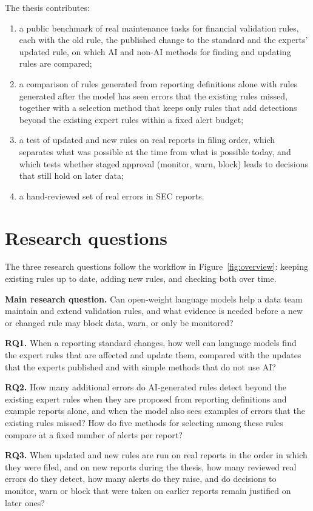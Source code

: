 \documentclass[11pt,a4paper]{article}
\let\oldsection\section
\renewcommand{\section}{\FloatBarrier\oldsection}
\begin{document}
The thesis contributes:
\begin{enumerate}
\item a public benchmark of real maintenance tasks for financial validation rules, each with the old rule, the published change to the standard and the experts' updated rule, on which AI and non-AI methods for finding and updating rules are compared;
\item a comparison of rules generated from reporting definitions alone with rules generated after the model has seen errors that the existing rules missed, together with a selection method that keeps only rules that add detections beyond the existing expert rules within a fixed alert budget;
\item a test of updated and new rules on real reports in filing order, which separates what was possible at the time from what is possible today, and which tests whether staged approval (monitor, warn, block) leads to decisions that still hold on later data;
\item a hand-reviewed set of real errors in SEC reports.
\end{enumerate}

\section{Research questions}
\label{sec:rq}

The three research questions follow the workflow in Figure~\ref{fig:overview}: keeping existing rules up to date, adding new rules, and checking both over time.

\textbf{Main research question.} Can open-weight language models help a data team maintain and extend validation rules, and what evidence is needed before a new or changed rule may block data, warn, or only be monitored?

\textbf{RQ1.} When a reporting standard changes, how well can language models find the expert rules that are affected and update them, compared with the updates that the experts published and with simple methods that do not use AI?

\textbf{RQ2.} How many additional errors do AI-generated rules detect beyond the existing expert rules when they are proposed from reporting definitions and example reports alone, and when the model also sees examples of errors that the existing rules missed? How do five methods for selecting among these rules compare at a fixed number of alerts per report?

\textbf{RQ3.} When updated and new rules are run on real reports in the order in which they were filed, and on new reports during the thesis, how many reviewed real errors do they detect, how many alerts do they raise, and do decisions to monitor, warn or block that were taken on earlier reports remain justified on later ones?
\end{document}
